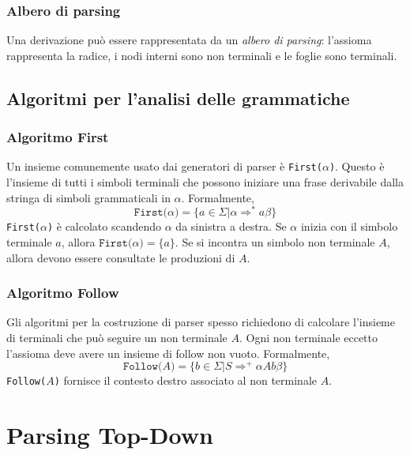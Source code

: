 \documentclass[11pt]{article}
\begin{document}
\subsubsection{Albero di parsing}
Una derivazione può essere rappresentata da un \textit{albero di parsing}: l'assioma rappresenta la radice, i nodi interni
sono non terminali e le foglie sono terminali.
\subsection{Algoritmi per l'analisi delle grammatiche}
\subsubsection{Algoritmo First}
Un insieme comunemente usato dai generatori di parser è \texttt{First($\alpha$)}. Questo è l'insieme di tutti i simboli 
terminali che possono iniziare una frase derivabile dalla stringa di simboli grammaticali in $\alpha$. Formalmente,
\begin{equation*}
    \texttt{First($\alpha$)}=\{a\in\Sigma|\alpha\Rightarrow^*a\beta\}
\end{equation*}
\texttt{First($\alpha$)} è calcolato scandendo $\alpha$ da sinistra a destra. Se $\alpha$ inizia con il simbolo terminale
$a$, allora $\texttt{First($\alpha$)}=\{a\}$. Se si incontra un simbolo non terminale $A$, allora devono essere consultate
le produzioni di $A$.
\subsubsection{Algoritmo Follow}
Gli algoritmi per la costruzione di parser spesso richiedono di calcolare l'insieme di terminali che può seguire un non 
terminale $A$. Ogni non terminale eccetto l'assioma deve avere un insieme di follow non vuoto. Formalmente,
\begin{equation*}
    \texttt{Follow($A$)}=\{b\in\Sigma|S\Rightarrow^+\alpha Ab\beta\}
\end{equation*}
\texttt{Follow($A$)} fornisce il contesto destro associato al non terminale $A$. 
\section{Parsing Top-Down}
\end{document}

